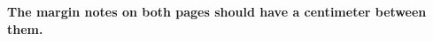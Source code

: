 \documentclass{memoir}
\begin{document}
 \textbf{The margin notes on both pages should have a centimeter between them.}

 \marginpar{\lipsum[2]}
 \lipsum[1]
 \marginpar{\color{red}\lipsum[2]}
 \lipsum[1]
 \marginpar{\lipsum[2]}
 \lipsum[1]
 \marginpar{\color{red}\lipsum[2]}
 \lipsum[1]
\end{document}
